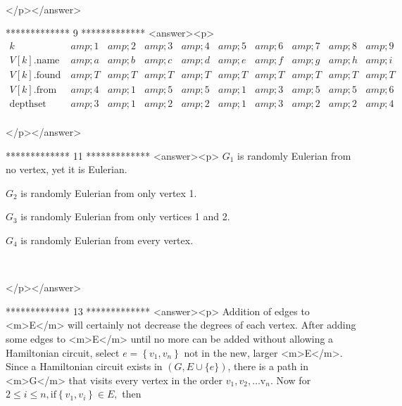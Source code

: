 \begin{doublespace}
\noindent\(\pmb{}\)
\end{doublespace}





</p></answer>


*************
9
*************
<answer><p> \(\begin{array}{cccccccccc}
 k\text{                       } &amp; 1 &amp; 2 &amp; 3 &amp; 4 &amp; 5 &amp; 6 &amp; 7 &amp; 8 &amp; 9 \\
 V[k].\text{name} &amp; a &amp; b &amp; c &amp; d &amp; e &amp; f &amp; g &amp; h &amp; i \\
 V[k].\text{found} &amp; T &amp; T &amp; T &amp; T &amp; T &amp; T &amp; T &amp; T &amp; T \\
 V[k].\text{from}\text{  } &amp; 4 &amp; 1 &amp; 5 &amp; 5 &amp; 1 &amp; 3 &amp; 5 &amp; 5 &amp; 6 \\
 \text{depth} \text{set}\text{     } &amp; 3 &amp; 1 &amp; 2 &amp; 2 &amp; 1 &amp; 3 &amp; 2 &amp; 2 &amp; 4 \\
\end{array}\)

</p></answer>


*************
11
*************
<answer><p> \(G_1\) is randomly Eulerian from no vertex, yet it is Eulerian. 



\(G_2\) is randomly Eulerian from only vertex 1. 



\(G_3\) is randomly Eulerian from only vertices 1 and 2. 



\(G_4\) is randomly Eulerian from every vertex.

\begin{doublespace}
\noindent\(\)
\end{doublespace}

</p></answer>


*************
13
*************
<answer><p> Addition of edges to <m>E</m> will certainly not decrease the degrees of each vertex. After adding some edges to <m>E</m> until no more
can be added without allowing a Hamiltonian circuit, select \(e=\left\{v_1,v_n\right\}\) not in the new, larger <m>E</m>. Since a Hamiltonian
circuit exists in \((G,E\cup \{e\})\), there is a path in <m>G</m> that visits every vertex in the order \(v_1,v_2,\text{$\ldots $v}_n\). Now
for \(2\leq i\leq n, \text{if} \left\{v_1,v_i\right\}\in E,\) then

